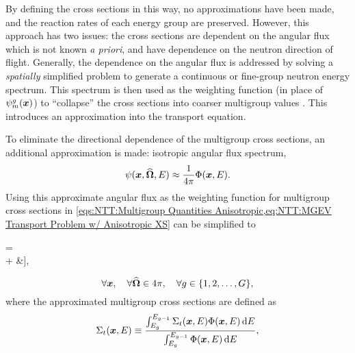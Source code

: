 {{{{                By defining the cross sections in this way, no approximations have been made, and the reaction rates of each energy group are preserved.
                However, this approach has two issues: the cross sections are dependent on the angular flux which is not known \textit{a priori}, and have dependence on the neutron direction of flight.
                Generally, the dependence on the angular flux is addressed by solving a \emph{spatially} simplified problem to generate a continuous or fine-group neutron energy spectrum.
                This spectrum is then used as the weighting function (in place of $\aflux$) to ``collapse'' the cross sections into coarser multigroup values \cite{Knott2010}.
                This introduces an approximation into the transport equation.

                To eliminate the directional dependence of the multigroup cross sections, an additional approximation is made: isotropic angular flux spectrum,
                \begin{equation}\label{eq:NTT:Multigroup Isotropic Spectrum}
                    \psi(\boldsymbol{x},\boldsymbol{\widehat{\Omega}},E) \approx \frac{1}{4\pi}\Phi(\boldsymbol{x}, E).
                \end{equation}
                Using this approximate angular flux as the weighting function for multigroup cross sections in \cref{eqs:NTT:Multigroup Quantities Anisotropic,eq:NTT:MGEV Transport Problem w/ Anisotropic XS} can be simplified to
                \begin{aequation}\label{eq:NTT:MGEV Transport Problem}
                    \left[\dir\vdot\grad + \xst\right]\aflux = \rfourpi\Bigg[&\suml[\gprime=1][G]\intl[\fourpi]\xss\aflux[\loc][\dirprime][\gprime]\ddirprime\\
                        + \frac{\spect}{\keff}&\suml[\gprime=1][G]\nufis\intl[\fourpi]\aflux[\loc][\dirprime][\gprime]\ddirprime\Bigg],
                \end{aequation}
                \begin{equation*}
                    \forall\boldsymbol{x}, \quad \forall\boldsymbol{\widehat{\Omega}}\in4\pi,\quad \forall g\in\{1,2,\ldots,G\},
                \end{equation*}
                where the approximated multigroup cross sections are defined as
                \begin{subequations}\label{eqs:NTT:Multigroup Cross Sections}
                    \begin{equation}\label{eq:NTT:Multigroup Total Cross Section}
                        \xst \defined \frac{\intl[E_{g}][E_{g-1}]\CrossSection_{t}(\loc,E)\FluxSpectrum(\loc,E)\dif{E}}{\intl[E_{g}][E_{g-1}]\FluxSpectrum(\loc,E)\dif{E}},

\end{equation}
\end{subequations}}}}}
